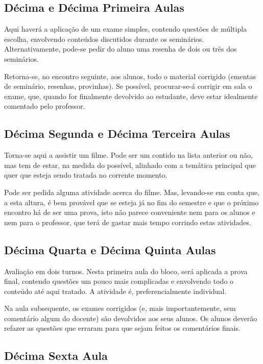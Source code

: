\documentclass[12pt,a4paper]{article}
\begin{document}
	\subsection*{Décima e Décima Primeira Aulas}
	
	Aqui haverá a aplicação de um exame simples, contendo questões 
	de múltipla escolha, envolvendo conteúdos discutidos durante os 
	seminários. Alternativamente, pode-se pedir do aluno uma resenha 
	de dois ou três dos seminários. 
	
	Retorna-se, no encontro seguinte, aos alunos, todo o material 
	corrigido (ementas de seminário, resenhas, provinhas). Se possível, 
	procurar-se-á corrigir em sala o exame, que, quando for finalmente 
	devolvido ao estudante, deve estar idealmente comentado 
	pelo professor. 
	
	\subsection*{Décima Segunda e Décima Terceira Aulas}
	
	Torna-se aqui a assistir um filme. Pode ser um contido na 
	lista anterior ou não, mas tem de estar, na medida do possível, 
	alinhado com a temática principal que quer que esteja sendo 
	tratada no corrente momento. 
	
	Pode ser pedida alguma atividade acerca do filme. Mas, 
	levando-se em conta que, a esta altura, é bem provável que se esteja 
	já no fim do semestre e que o próximo encontro há de ser uma prova, 
	isto não parece conveniente nem para os alunos e nem para o professor, 
	que terá de gastar mais tempo corrindo estas atividades. 
	
	\subsection*{Décima Quarta e Décima Quinta Aulas}
	
	Avaliação em dois turnos. Nesta primeira aula do bloco, será aplicada 
	a prova final, contendo questões um pouco mais complicadas e 
	envolvendo todo o conteúdo até aqui tratado. A atividade é, 
	preferencialmente individual. 
	
	Na aula subsequente, os exames corrigidos (e, mais importantemente,  
	sem comentário algum do docente) são devolvidos aos seus alunos. Os 
	alunos deverão refazer as questões que erraram para que sejam 
    feitos os comentários finais. 
	
	\subsection*{Décima Sexta Aula}
	
\end{document}
